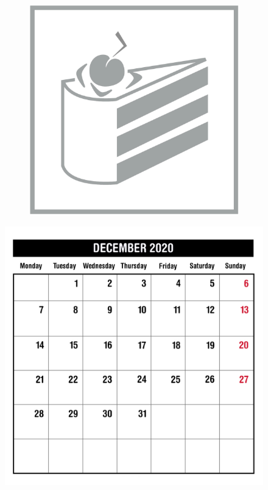 \begin{figure}[H]
\begin{subfigure}[l]{0.195\linewidth}
  \end{subfigure}
  \begin{subfigure}[l]{0.195\linewidth}
    \includegraphics[width=\textwidth]{Sources/PortalIcons/d10.jpg}
  \end{subfigure}
\end{figure}


\newpage
\begin{figure}[H]
    \includegraphics[width=\textwidth]{Sources/MonthViews/December20.jpg}
\end{figure}

